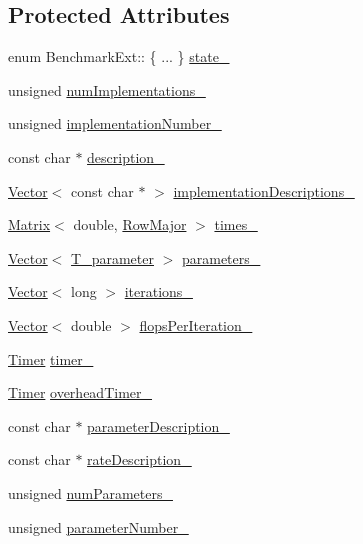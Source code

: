 \subsection*{Protected Attributes}
\begin{DoxyCompactItemize}
\item 
enum Benchmark\+Ext\+:: \{ ... \}  \hyperlink{classBenchmarkExt_ac79be62db2a83276e89ab21960fd1cf7}{state\+\_\+}
\item 
unsigned \hyperlink{classBenchmarkExt_a113bc04dbe3b34a0cac58d15e1c63ed6}{num\+Implementations\+\_\+}
\item 
unsigned \hyperlink{classBenchmarkExt_a1d559c9a7dec5b5eb99896a45476a40d}{implementation\+Number\+\_\+}
\item 
const char $\ast$ \hyperlink{classBenchmarkExt_a3a381fb60c6576ac1f0a85202bcb2813}{description\+\_\+}
\item 
\hyperlink{classVector}{Vector}$<$ const char $\ast$ $>$ \hyperlink{classBenchmarkExt_a0bf72f1aa5fb68ab91e6a361409d2b8e}{implementation\+Descriptions\+\_\+}
\item 
\hyperlink{classMatrix}{Matrix}$<$ double, \hyperlink{classRowMajor}{Row\+Major} $>$ \hyperlink{classBenchmarkExt_ae5e33ddbac604a0ada9c6e95f2d6341d}{times\+\_\+}
\item 
\hyperlink{classVector}{Vector}$<$ \hyperlink{classBenchmarkExt_a8b17d300898ee83a0c10463c1b53cfa5}{T\+\_\+parameter} $>$ \hyperlink{classBenchmarkExt_a227f3a8ff41b5c86c40aa8b9c6cf7402}{parameters\+\_\+}
\item 
\hyperlink{classVector}{Vector}$<$ long $>$ \hyperlink{classBenchmarkExt_abb305956ddfc7f52e081390eb630e8b6}{iterations\+\_\+}
\item 
\hyperlink{classVector}{Vector}$<$ double $>$ \hyperlink{classBenchmarkExt_a4dce95721728453b7e10db0c7373e3cd}{flops\+Per\+Iteration\+\_\+}
\item 
\hyperlink{classTimer}{Timer} \hyperlink{classBenchmarkExt_ab04058d86f083b514773494c17593c0b}{timer\+\_\+}
\item 
\hyperlink{classTimer}{Timer} \hyperlink{classBenchmarkExt_a2e1215f0dfeceea6fdcbf8908a9a3b8b}{overhead\+Timer\+\_\+}
\item 
const char $\ast$ \hyperlink{classBenchmarkExt_ae1c3dfaa3c0ca464100a01e01d2dff1c}{parameter\+Description\+\_\+}
\item 
const char $\ast$ \hyperlink{classBenchmarkExt_aebe65cfdf45cfdb601b2b54059ba7628}{rate\+Description\+\_\+}
\item 
unsigned \hyperlink{classBenchmarkExt_aa8504a4be8de5aa135895c34efbb15c0}{num\+Parameters\+\_\+}
\item 
unsigned \hyperlink{classBenchmarkExt_a02f860acfdd29c1d2874996d3d187dad}{parameter\+Number\+\_\+}
\end{DoxyCompactItemize}


